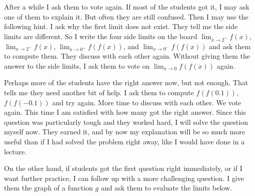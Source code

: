 \documentclass[11pt]{article}
\newcommand {\DS} [1] {${\displaystyle #1}$}
\newcommand{\vv}{\vspace{.5cm}}
\begin{document}
\begin{example}
\begin{comments}
{\baselineskip
After a while I ask them to vote again.  If most of the students got it, I may ask one of them to explain it.  But often they are still confused.  Then I may use the following hint.  I ask why the first limit does not exist.  They tell me the side limits are different.   So I write the four side limits on the board \DS{\lim_{x \to 2^+} f(x)}, \DS{\lim_{x \to 2^-} f(x)}, \DS{\lim_{x \to 0^+} f(f(x))}, and \DS{\lim_{x \to 0^-} f(f(x))} and ask them to compute them.  They discuss with each other again.  Without giving them the answer to the side limits, I ask them to vote on \DS{\lim_{x \to 0} f(f(x))} again.


Perhaps more of the students have the right answer now, but not enough.   That tells me they need another bit of help.  I ask them to compute \DS{f(f(0.1))}, \DS{f(f(-0.1))} and try again.  More time to discuss with each other.  We vote again.  This time I am satisfied with how many got the right answer.  Since this question was particularly tough and they worked hard, I will solve the question myself now.  They earned it, and by now my explanation will be so much more useful than if I had solved the problem right away, like I would have done in a lecture.

On the other hand, if students got the first question right immediately, or if I want further practice, I can follow up with a more challenging question. I give them the graph of a function $g$ and ask them to evaluate the limits below.
}

\vv


\end{comments}
\end{example}
\end{document}
